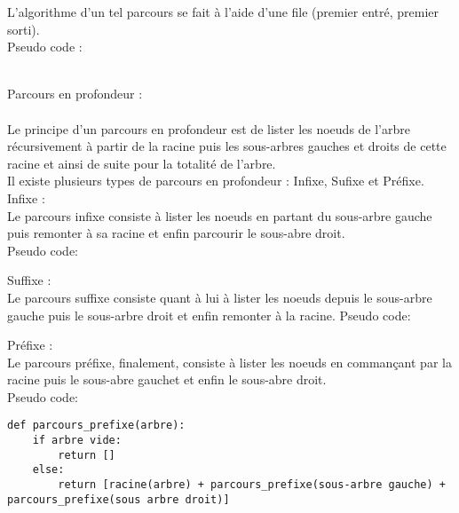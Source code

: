 \documentclass{report}
\begin{document}
L'algorithme d'un tel parcours se fait à l'aide d'une file (premier entré, premier sorti).\\
Pseudo code : \\
\begin{comment}
def parcours_largueur(arbre):
	si arbre vide :
	retourner liste vide
	sinon:
	retouner [  racine(arbre) + racine(sous-arbre gauche) + racine(sous-arbre droit)  ]
\end{comment}
~\\
Parcours en profondeur :\\
~\\
Le principe d'un parcours en profondeur est de lister les noeuds de l'arbre récursivement à partir de la racine puis les sous-arbres gauches et droits de cette racine et ainsi de suite pour la totalité de l'arbre.\\
Il existe plusieurs types de parcours en profondeur : Infixe, Sufixe et Préfixe.\\
Infixe : \\
Le parcours infixe consiste à lister les noeuds en partant du sous-arbre gauche puis remonter à sa racine et enfin parcourir le sous-abre droit.\\
Pseudo code:\\
\begin{comment}
def parcours_infixe(arbre):
	si arbre vide :
	retourner liste vide
	sinon:
	retourner [  parcours_infixe(sous-arbre gauche) + racine(arbre) + parcours_infixe(sous-arbre droit)  ]
\end{comment}
Suffixe :\\
Le parcours suffixe consiste quant à lui à lister les noeuds depuis le sous-arbre gauche puis le sous-arbre droit et enfin remonter à la racine.
Pseudo code:\\
\begin{comment}
def parcours_suffixe(arbre):
	si arbre vide :
	retourner liste vide
	sinon:
	retouner [ parcours_suffixe(sous-arbre gauche) +  parcours_suffixe(sous-arbre droit) + racine(arbre)  ]
\end{comment}
Préfixe : \\
Le parcours préfixe, finalement, consiste à lister les noeuds en commançant par la racine puis le sous-abre gauchet et enfin le sous-abre droit.\\
Pseudo code:\\
\begin{comment}
def parcours_prefixe(arbre):
	si arbre vide :
	retourner liste vide
	sinon:
	retouner [ racine(arbre) + parcours_prefixe(sous-arbre gauche) +  parcours_prefixe(sous-arbre droit)  ]
\end{comment}
\begin{lstlisting}
def parcours_prefixe(arbre):
	if arbre vide:
		return []
	else:
		return [racine(arbre) + parcours_prefixe(sous-arbre gauche) + parcours_prefixe(sous arbre droit)]
\end{lstlisting}
\end{document}
